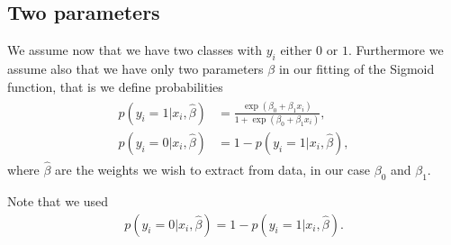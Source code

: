 \documentclass[letterpaper,10pt,english]{sphinxmanual}
\begin{document}
\noindent{}

\noindent{}

\noindent{}


\subsection{Two parameters}
\label{\detokenize{chapter5:two-parameters}}
We assume now that we have two classes with \(y_i\) either \(0\) or \(1\). Furthermore we assume also that we have only two parameters \(\beta\) in our fitting of the Sigmoid function, that is we define probabilities
\begin{equation*}
\begin{split}
\begin{align*}
p(y_i=1|x_i,\hat{\beta}) &= \frac{\exp{(\beta_0+\beta_1x_i)}}{1+\exp{(\beta_0+\beta_1x_i)}},\nonumber\\
p(y_i=0|x_i,\hat{\beta}) &= 1 - p(y_i=1|x_i,\hat{\beta}),
\end{align*}
\end{split}
\end{equation*}
where \(\hat{\beta}\) are the weights we wish to extract from data, in our case \(\beta_0\) and \(\beta_1\).

Note that we used
\begin{equation*}
\begin{split}
p(y_i=0\vert x_i, \hat{\beta}) = 1-p(y_i=1\vert x_i, \hat{\beta}).
\end{split}
\end{equation*}
\end{document}
